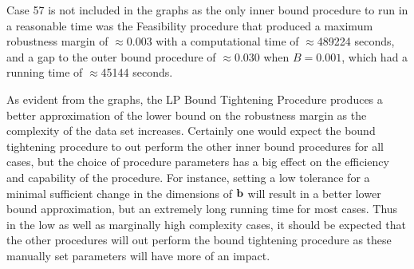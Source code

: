 Case 57 is not included in the graphs as the only inner bound procedure to run in a reasonable time was the Feasibility procedure that produced a maximum robustness margin of $\approx$0.003 with a computational time of $\approx$489224 seconds, and a gap to the outer bound procedure of $\approx 0.030$ when $B=0.001$, which had a running time of $\approx$45144 seconds.

As evident from the graphs, the LP Bound Tightening Procedure produces a better approximation of the lower bound on the robustness margin as the complexity of the data set increases. 
Certainly one would expect the bound tightening procedure to out perform the other inner bound procedures for all cases, but the choice of procedure parameters has a big effect on the efficiency and capability of the procedure. 
For instance, setting a low tolerance for a minimal sufficient change in the dimensions of $\mathbf{b}$ will result in a better lower bound approximation, but an extremely long running time for most cases. 
Thus in the low as well as marginally high complexity cases, it should be expected that the other procedures will out perform the bound tightening procedure as these manually set parameters will have more of an impact. 


